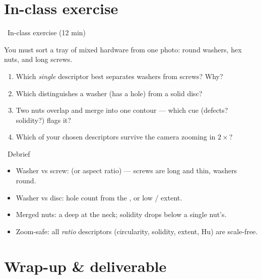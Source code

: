 \documentclass[10pt,aspectratio=169]{beamer}
\begin{document}
\section{In-class exercise}

\begin{frame}{\faPen~In-class exercise (12 min)}
  \begin{infobox}
    You must sort a tray of mixed hardware from one photo: round washers, hex nuts, and long screws.
  \end{infobox}
  \begin{enumerate}
    \item Which \emph{single} descriptor best separates washers from screws? Why?
    \item Which distinguishes a washer (has a hole) from a solid disc?
    \item Two nuts overlap and merge into one contour — which cue (defects? solidity?) flags it?
    \item Which of your chosen descriptors survive the camera zooming in $2\times$?
  \end{enumerate}
\end{frame}

\begin{frame}{\faPen~Debrief}
  \begin{itemize}
    \item Washer vs screw:  (or aspect ratio) — screws are long and thin, washers round.
    \item Washer vs disc: hole count from the , or low  / extent.
    \item Merged nuts: a deep  at the neck; solidity drops below a single nut's.
    \item Zoom-safe: all \emph{ratio} descriptors (circularity, solidity, extent, Hu) are scale-free. \checkmark
  \end{itemize}
\end{frame}

\section{Wrap-up \& deliverable}
\end{document}
